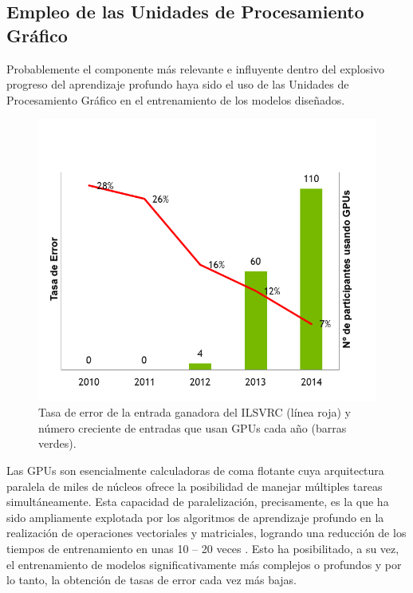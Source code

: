 \subsection{Empleo de las Unidades de Procesamiento Gráfico}

Probablemente el componente más relevante e influyente dentro del explosivo progreso del aprendizaje profundo haya sido el uso de las Unidades de Procesamiento Gráfico en el entrenamiento de los modelos diseñados.

\begin{figure}
    \centering
    \includegraphics[scale=0.8]{Images/ILSVRC.png}
    \caption{Tasa de error de la entrada ganadora del ILSVRC (línea roja) y número creciente de entradas que usan GPUs cada año (barras verdes).\cite{img:ILSVRC}}
    \label{fig:ILSVRC}
\end{figure}

Las GPUs son esencialmente calculadoras de coma flotante cuya arquitectura paralela de miles de núcleos ofrece la posibilidad de manejar múltiples tareas simultáneamente. Esta capacidad de paralelización, precisamente, es la que ha sido ampliamente explotada por los algoritmos de aprendizaje profundo en la realización de operaciones vectoriales y matriciales, logrando una reducción de los tiempos de entrenamiento en unas 10 -- 20 veces \cite{DeepLearning}. Esto ha posibilitado, a su vez, el entrenamiento de modelos significativamente más complejos o profundos y por lo tanto, la obtención de tasas de error cada vez más bajas.

